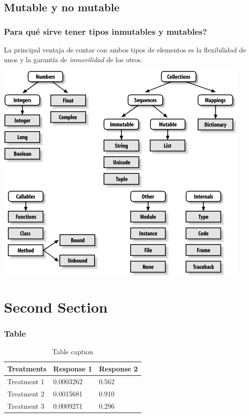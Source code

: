 \documentclass{beamer}
\begin{document}
\subsection{Mutable y no mutable}
\begin{frame}
\frametitle{Para qué sirve tener tipos inmutables y mutables?}
La principal ventaja de contar con ambos tipos de elementos es la flexibilidad de unos y la garantía de \textit{inmovilidad} de los otros.
\begin{center}
\includegraphics[height=0.7\textheight]{tree.png}
\end{center}
\end{frame}
\section{Second Section}

\begin{frame}
\frametitle{Table}
\begin{table}
\begin{tabular}{l l l}
\toprule
\textbf{Treatments} & \textbf{Response 1} & \textbf{Response 2}\\
\midrule
Treatment 1 & 0.0003262 & 0.562 \\
Treatment 2 & 0.0015681 & 0.910 \\
Treatment 3 & 0.0009271 & 0.296 \\
\bottomrule
\end{tabular}
\caption{Table caption}
\end{table}
\end{frame}
\end{document}
